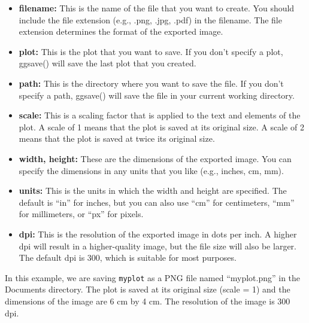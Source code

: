 \documentclass[
  letterpaper,
  DIV=11,
  numbers=noendperiod]{scrartcl}
\begin{document}
\begin{itemize}
\item
  \textbf{filename:} This is the name of the file that you want to
  create. You should include the file extension (e.g., .png, .jpg, .pdf)
  in the filename. The file extension determines the format of the
  exported image.
\item
  \textbf{plot:} This is the plot that you want to save. If you don't
  specify a plot, ggsave() will save the last plot that you created.
\item
  \textbf{path:} This is the directory where you want to save the file.
  If you don't specify a path, ggsave() will save the file in your
  current working directory.
\item
  \textbf{scale:} This is a scaling factor that is applied to the text
  and elements of the plot. A scale of 1 means that the plot is saved at
  its original size. A scale of 2 means that the plot is saved at twice
  its original size.
\item
  \textbf{width, height:} These are the dimensions of the exported
  image. You can specify the dimensions in any units that you like
  (e.g., inches, cm, mm).
\item
  \textbf{units:} This is the units in which the width and height are
  specified. The default is ``in'' for inches, but you can also use
  ``cm'' for centimeters, ``mm'' for millimeters, or ``px'' for pixels.
\item
  \textbf{dpi:} This is the resolution of the exported image in dots per
  inch. A higher dpi will result in a higher-quality image, but the file
  size will also be larger. The default dpi is 300, which is suitable
  for most purposes.
\end{itemize}

In this example, we are saving \texttt{myplot} as a PNG file named
``myplot.png'' in the Documents directory. The plot is saved at its
original size (scale = 1) and the dimensions of the image are 6 cm by 4
cm. The resolution of the image is 300 dpi.
\end{document}
